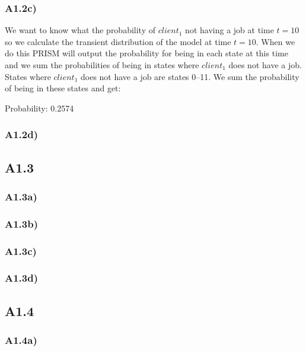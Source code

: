 \documentclass[12pt]{report}
\begin{document}
\subsubsection*{A1.2c)}
We want to know what the probability of $client_1$ not having a job at time $t = 10$ so we calculate the transient distribution of the model at time $t = 10$. When we do this PRISM will output the probability for being in each state at this time and we sum the probabilities of being in states where $client_1$ does not have a job. States where $client_1$ does not have a job are states 0--11. We sum the probability of being in these states and get:
\begin{center}
Probability: 0.2574
\end{center}

\subsubsection*{A1.2d)}


\subsection*{A1.3}


\subsubsection*{A1.3a)}


\subsubsection*{A1.3b)}


\subsubsection*{A1.3c)}


\subsubsection*{A1.3d)}


\subsection*{A1.4}


\subsubsection*{A1.4a)}
\end{document}
